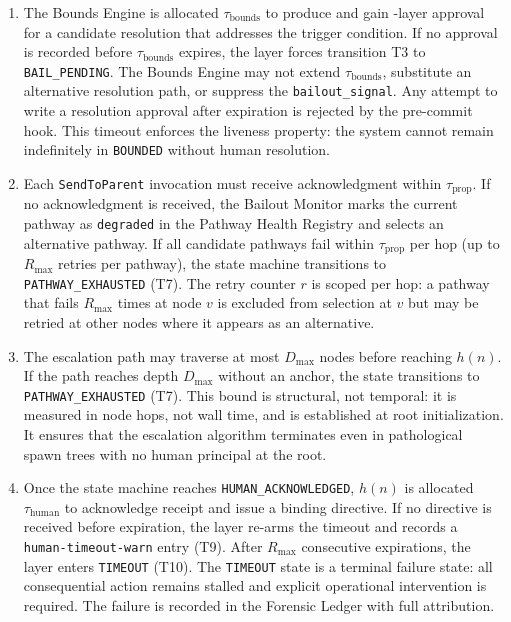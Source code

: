 \begin{enumerate}\itemsep=0pt
\item[\textbf{$\tau_{\text{bounds}}$ --- BOUNDED state timeout.}] The Bounds Engine is allocated $\tau_{\text{bounds}}$ to produce and gain \fact{}-layer approval for a candidate resolution that addresses the trigger condition. If no approval is recorded before $\tau_{\text{bounds}}$ expires, the \fact{} layer forces transition T3 to \texttt{BAIL\_PENDING}. The Bounds Engine may not extend $\tau_{\text{bounds}}$, substitute an alternative resolution path, or suppress the \texttt{bailout\_signal}. Any attempt to write a resolution approval after expiration is rejected by the pre-commit hook. This timeout enforces the liveness property: the system cannot remain indefinitely in \texttt{BOUNDED} without human resolution.

\item[\textbf{$\tau_{\text{prop}}$ --- Propagation timeout.}] Each \texttt{SendToParent} invocation must receive acknowledgment within $\tau_{\text{prop}}$. If no acknowledgment is received, the Bailout Monitor marks the current pathway as \texttt{degraded} in the Pathway Health Registry and selects an alternative pathway. If all candidate pathways fail within $\tau_{\text{prop}}$ per hop (up to $R_{\max}$ retries per pathway), the state machine transitions to \texttt{PATHWAY\_EXHAUSTED} (T7). The retry counter $r$ is scoped per hop: a pathway that fails $R_{\max}$ times at node $v$ is excluded from selection at $v$ but may be retried at other nodes where it appears as an alternative.

\item[\textbf{$\tau_{\text{cap}}$ --- Cascade depth limit.}] The escalation path may traverse at most $D_{\max}$ nodes before reaching $h(n)$. If the path reaches depth $D_{\max}$ without an anchor, the state transitions to \texttt{PATHWAY\_EXHAUSTED} (T7). This bound is structural, not temporal: it is measured in node hops, not wall time, and is established at root initialization. It ensures that the escalation algorithm terminates even in pathological spawn trees with no human principal at the root.

\item[\textbf{$\tau_{\text{human}}$ --- Human acknowledgment timeout.}] Once the state machine reaches \texttt{HUMAN\_ACKNOWLEDGED}, $h(n)$ is allocated $\tau_{\text{human}}$ to acknowledge receipt and issue a binding directive. If no directive is received before expiration, the \fact{} layer re-arms the timeout and records a \texttt{human-timeout-warn} entry (T9). After $R_{\max}$ consecutive expirations, the \fact{} layer enters \texttt{TIMEOUT} (T10). The \texttt{TIMEOUT} state is a terminal failure state: all consequential action remains stalled and explicit operational intervention is required. The failure is recorded in the Forensic Ledger with full attribution.
\end{enumerate}

